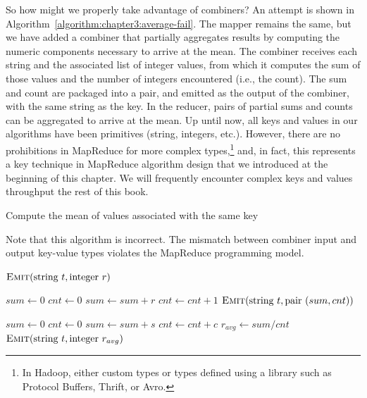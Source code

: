 So how might we properly take advantage of combiners?  An attempt is
shown in Algorithm~\ref{algorithm:chapter3:average-fail}.  The mapper
remains the same, but we have added a combiner that partially
aggregates results by computing the numeric components necessary to
arrive at the mean.  The combiner receives each string and the
associated list of integer values, from which it computes the sum of
those values and the number of integers encountered (i.e., the count).
The sum and count are packaged into a pair, and emitted as the output
of the combiner, with the same string as the key.  In the reducer,
pairs of partial sums and counts can be aggregated to arrive at the
mean.  Up until now, all keys and values in our algorithms have been
primitives (string, integers, etc.).  However, there are no
prohibitions in MapReduce for more complex types,\footnote{In Hadoop,
  either custom types or types defined using a library such as
  Protocol Buffers, Thrift, or Avro.} and, in fact, this represents a
key technique in MapReduce algorithm design that we introduced at the
beginning of this chapter.  We will frequently encounter complex keys
and values throughput the rest of this book.

\begin{algorithm}[t]
\caption{Compute the mean of values associated with the same key}
\label{algorithm:chapter3:average-fail}
Note that this algorithm is incorrect. The mismatch between
combiner input and output key-value types violates the MapReduce
programming model.
\algrenewcommand{}
\algrenewcommand{}
  \begin{algorithmic}[1]
    \State $\textsc{Emit}(\textrm{string }t, \textrm{integer }r)$
    \EndProcedure
    \EndFunction
  \end{algorithmic}

  \begin{algorithmic}[1]
    \State $sum \gets 0$
    \State $cnt \gets 0$
    \State $sum \gets sum + r$
    \State $cnt \gets cnt + 1$
    \EndFor
    \State $\textsc{Emit}(\textrm{string }t, \textrm{pair } (sum, cnt))$
    \EndProcedure
    \EndFunction
  \end{algorithmic}

  \begin{algorithmic}[1]
    \State $sum \gets 0$
    \State $cnt \gets 0$
    \State $sum \gets sum + s$
    \State $cnt \gets cnt + c$
    \EndFor
    \State $r_{avg} \gets sum/cnt$
    \State $\textsc{Emit}(\textrm{string }t, \textrm{integer } r_{avg})$
    \EndProcedure
    \EndFunction
  \end{algorithmic}
\end{algorithm}

